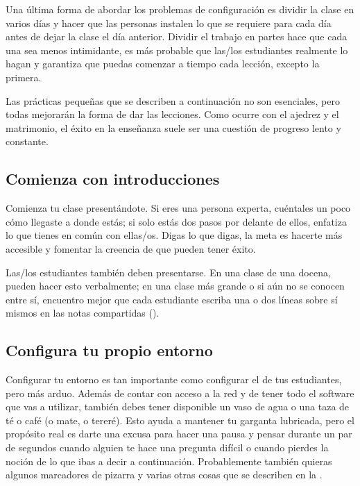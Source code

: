 Una última forma de abordar los problemas de configuración es dividir la clase en varios días
y hacer que las personas instalen lo que se requiere para cada día
antes de dejar la clase el día anterior.
Dividir el trabajo en partes hace que cada una sea menos intimidante,
es más probable que las/los estudiantes realmente lo hagan
y garantiza que puedas comenzar a tiempo cada lección, excepto la primera.


Las prácticas pequeñas que se describen a continuación no son esenciales,
pero todas mejorarán la forma de dar las lecciones.
Como ocurre con el ajedrez y el matrimonio,
el éxito en la enseñanza suele ser una cuestión de progreso lento y constante.

\subsection*{Comienza con introducciones}

Comienza tu clase presentándote.
Si eres una persona experta,
cuéntales un poco cómo llegaste a donde estás;
si solo estás dos pasos por delante de ellos,
enfatiza lo que tienes en común con ellas/os.
Digas lo que digas,
la meta es hacerte más accesible
y fomentar la creencia de que pueden tener éxito.

Las/los estudiantes también deben presentarse.
En una clase de una docena,
pueden hacer esto verbalmente;
en una clase más grande o si aún no se conocen entre sí,
encuentro mejor que cada estudiante escriba una o dos líneas sobre sí mismos en las notas compartidas ().

\subsection*{Configura tu propio entorno}

Configurar tu entorno es tan importante como configurar el de tus estudiantes,
pero más arduo.
Además de contar con acceso a la red y de tener todo el software que vas a utilizar,
también debes tener disponible un vaso de agua
o una taza de té o café (o mate, o tereré).
Esto ayuda a mantener tu garganta lubricada,
pero el propósito real es darte una excusa para hacer una pausa y pensar durante un par de segundos
cuando alguien te hace una pregunta difícil
o cuando pierdes la noción de lo que ibas a decir a continuación.
Probablemente también quieras algunos marcadores de pizarra
y varias otras cosas que se describen en la .

